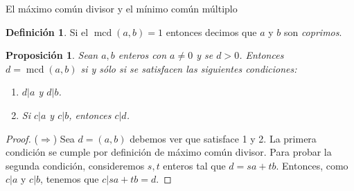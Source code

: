 \documentclass[11pt,spanish,makeidx]{amsbook}
\newtheorem{proposicion}[teorema]{Proposici\'on}
\newtheorem{corolario}[teorema]{Corolario}
\theoremstyle{definition}
\newtheorem{definicion}{Definici\'on}[section]
\theoremstyle{remark}
\newcommand \ZZ{{\mathbb Z}}
\newcommand \mcd{\operatorname{mcd}}
\begin{document}
\begin{section}{El máximo común divisor y el mínimo común múltiplo}
\begin{definicion}
	Si el $\mcd(a,b)=1$ entonces decimos que $a$ y $ b$ son {\em coprimos}.
\end{definicion}


\begin{comment}
	\begin{proposicion} Sean $a, b$ enteros,  algunos de ellos no nulo, entonces 
	
	\begin{equation*}
	(a,b)={\operatorname{min}}\{m\cdot a+n\cdot b>0 : m,n\in \ZZ\}
	\end{equation*}
	\end{proposicion}
	\begin{proof}
	Sin pérdida de generalidad podemos suponer  que $a\ne 0$ y cambiando eventualmente $a$ por $-a$, podemos considerar  a $a>0$. Llamemos $r$ al miembro de la derecha y veamos que  $r\vert a$. Es claro que $r\le a=1\cdot a+0\cdot b$. Ahora dividimos $a$ por $r$ y tenemos $a=q\cdot r+r'$, con $r'<r$. Si $r'=0, r\vert a$, en caso contrario, llegamos a la siguiente contradicción: como $r=m\cdot a+n\cdot b$ para ciertos $m,n\in\mathbb{Z}$, se tiene $r'=a-q(m\cdot a+n\cdot b)$, es decir que $r'> 0$ y es combinación lineal entera de $a$ y $b$. Esto implica $r\le r'$, lo cual es absurdo.
	
	De la misma forma se tiene que $r\vert b$. Por ser divisor común, tenemos que $r\le (a,b)$.
	
	Recíprocamente, como $(a,b)$ es divisor de $a$ y de  $b$, tenemos que $(a,b)$ divide a $r=m\cdot a+n\cdot b$. Por lo tanto $(a,b)\le r$. Concluimos que $(a,b)=r$.
	\end{proof}
	
	\begin{corolario}\label{t1.7.1} Sean $a$ y $b$ enteros, $b$ no nulo y sea $d=\mcd(a,b)$. Entonces existen enteros $s$ y $t$ tales que
	$$
	d=sa+tb.
	$$
	\end{corolario}
	
\end{comment}


\begin{proposicion}\label{prop-def2-mcd}  Sean $a,b$ enteros con $a \not = 0$ y se $d>0$. Entonces  $d =\mcd(a,b)$ si y sólo si se satisfacen las siguientes condiciones:
	\begin{enumerate}
		\item $d | a$ y $d | b$.
		\item Si $c | a$ y $c |b$, entonces $c | d$.
	\end{enumerate}
\end{proposicion}
\begin{proof} ($\Rightarrow$) Sea $d=(a,b)$  debemos ver que satisface 1 y 2. 
	La primera condición se  cumple por definición de máximo común divisor. Para probar la segunda condición, consideremos $s,t$ enteros tal que $d=s a+ t b$. Entonces, como $c|a$ y $c | b$,  tenemos que $c|sa+ t b=d$.
	

\end{proof}
\end{section}
\end{document}

